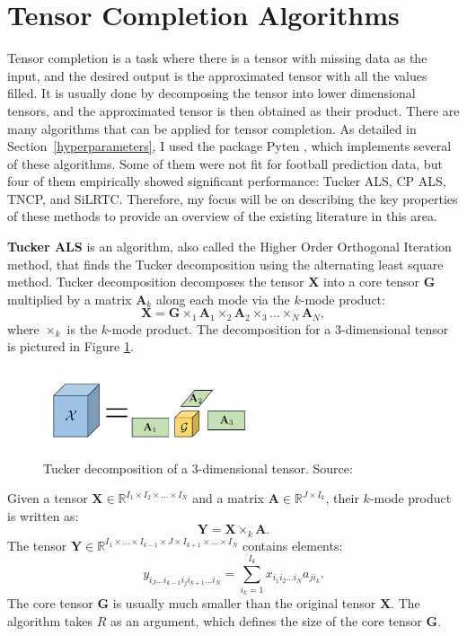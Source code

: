 \documentclass[thesis=M,english]{FITthesis}[2019/12/23]
\begin{document}
\section{Tensor Completion Algorithms}
\label{tensor_algs}
Tensor completion is a task where there is a tensor with missing data as the input, and the desired output is the approximated tensor with all the values filled. It is usually done by decomposing the tensor into lower dimensional tensors, and the approximated tensor is then obtained as their product. There are many algorithms that can be applied for tensor completion. As detailed in Section~\ref{hyperparameters}, I used the package Pyten \cite{pyten}, which implements several of these algorithms. Some of them were not fit for football prediction data, but four of them empirically showed significant performance: Tucker ALS, CP ALS, TNCP, and SiLRTC. Therefore, my focus will be on describing the key properties of these methods to provide an overview of the existing literature in this area.

\textbf{Tucker ALS} is an algorithm, also called the Higher Order Orthogonal Iteration method, that finds the Tucker decomposition using the alternating least square method. Tucker decomposition decomposes the tensor $\boldsymbol{X}$ into a core tensor $\boldsymbol{G}$ multiplied by a matrix $\boldsymbol{A}_k$ along each mode via the $k$-mode product:$$\boldsymbol{X} = \boldsymbol{G} \times_1 \boldsymbol{A}_1 \times_2 \boldsymbol{A}_2 \times_3 \dots \times_N \boldsymbol{A}_N,$$ where $\times_k$ is the $k$-mode product. The decomposition for a 3-dimensional tensor is pictured in Figure \ref{fig:tucker_decomp}.
\begin{figure}[h]
    \centering
    \includegraphics[width=0.6\textwidth]{figures/tucker_decomp.png}
    \caption{Tucker decomposition of a 3-dimensional tensor. Source:~\cite{tucker_decomp_pic}}
    \label{fig:tucker_decomp}
\end{figure}
Given a tensor $\boldsymbol{X} \in \mathbb{R}^{I_1 \times I_2 \times \dots \times I_N}$ and a matrix $\boldsymbol{A} \in \mathbb{R}^{J \times I_k}$, their $k$-mode product is written as: $$\boldsymbol{Y} = \boldsymbol{X} \times_k \boldsymbol{A}.$$ The tensor $\boldsymbol{Y} \in \mathbb{R}^{I_1 \times \dots \times I_{k-1} \times J \times I_{k+1} \times \dots \times I_N}$ contains elements: $$y_{i_J \dots i_{k-1} i_j i_{k+1} \dots i_N} = \sum_{i_k = 1}^{I_k} x_{i_1 i_2 \dots i_N} a_{j i_k}.$$ The core tensor $\boldsymbol{G}$ is usually much smaller than the original tensor $\boldsymbol{X}$. The algorithm takes $R$ as an argument, which defines the size of the core tensor $\boldsymbol{G}$.
\end{document}
